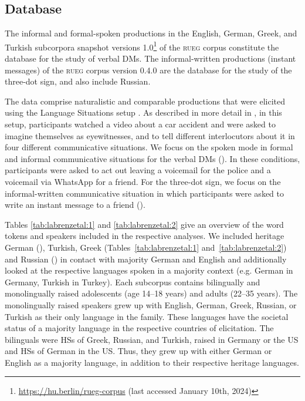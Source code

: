 \documentclass[output=paper,colorlinks,citecolor=brown]{langscibook}
\begin{document}
\subsection{Database}
\label{sec:sub:labrenzetal:Database}

The informal and formal-spoken productions in the English, German, Greek, and Turkish subcorpora snapshot versions 1.0\footnote{\url{https://hu.berlin/rueg-corpus} (last accessed January 10th, 2024)} of the \textsc{rueg} corpus constitute the database for the study of verbal DMs. The informal-written productions (instant messages) of the \textsc{rueg} corpus version 0.4.0 \citep{wiese_rueg_2021} are the database for the study of the three-dot sign, and also include Russian. 

The data comprise naturalistic and comparable productions that were elicited using the Language Situations setup \citep{wiese_language_2020}. As described in more detail in , in this setup, participants watched a video about a car accident and were asked to imagine themselves as eyewitnesses, and to tell different interlocutors about it in four different communicative situations. We focus on the spoken mode in formal and informal communicative situations for the verbal DMs (). In these conditions, participants were asked to act out leaving a voicemail for the police and a voicemail via WhatsApp for a friend. For the three-dot sign, we focus on the informal-written communicative situation in which participants were asked to write an instant message to a friend ().

\noindent Tables \ref{tab:labrenzetal:1} and \ref{tab:labrenzetal:2} give an overview of the word tokens and speakers included in the respective analyses. We included heritage German (), Turkish, Greek (Tables~\ref{tab:labrenzetal:1} and~\ref{tab:labrenzetal:2}) and Russian () in contact with majority German and English and additionally looked at the respective languages spoken in a majority context (e.g. German in Germany, Turkish in Turkey). Each subcorpus contains bilingually and monolingually raised adolescents (age 14--18 years) and adults (22--35 years). The monolingually raised speakers grew up with English, German, Greek, Russian, or Turkish as their only language in the family. These languages have the societal status of a majority language in the respective countries of elicitation. The bilinguals were HSs of Greek, Russian, and Turkish, raised in Germany or the US and HSs of German in the US. Thus, they grew up with either German or English as a majority language, in addition to their respective heritage languages.
\end{document}
